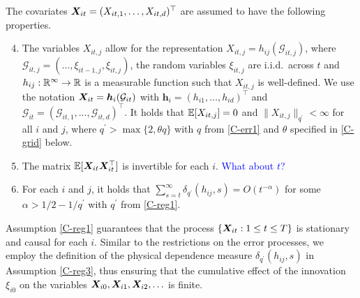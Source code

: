 \documentclass[a4paper,12pt]{article}
\begin{document}
The covariates $\boldsymbol{X}_{it} = (X_{it,1},\ldots,X_{it,d})^\top$ are assumed to have the following properties. 
\begin{enumerate}[label=(C\arabic*),leftmargin=1.05cm]
\setcounter{enumi}{3}
\item \label{C-reg1} The variables $X_{it,j}$ allow for the representation $X_{it,j} = h_{ij}(\mathcal{G}_{it,j})$, where $\mathcal{G}_{it,j} = (\ldots, \xi_{it-1,j}, \xi_{it,j})$, the random variables $\xi_{it,j}$ are i.i.d.\ across $t$ and $h_{ij}: \mathbb{R}^\infty \rightarrow \mathbb{R}$ is a measurable function such that $X_{it,j}$ is well-defined. We use the notation $\boldsymbol{X}_{it} = \boldsymbol{h}_{i}(\mathcal{G}_{it})$ with $\boldsymbol{h}_i = (h_{i1}, \ldots, h_{id})^\top$ and $\mathcal{G}_{it} = (\mathcal{G}_{it,1}, \ldots, \mathcal{G}_{it,d})^\top$. It holds that $\mathbb{E} [X_{it,j}]=0$ and $\| X_{it,j} \|_{q^\prime} <\infty$ for all $i$ and $j$, where $q^\prime > \max \{ 2, \theta q \}$ with $q$ from \ref{C-err1} and $\theta$ specified in \ref{C-grid} below.
\item \label{C-reg2} The matrix $\mathbb{E}[\boldsymbol{X}_{it} \boldsymbol{X}_{it}^\top]$ is invertible for each $i$. \textcolor{blue}{What about $t$?}
\item \label{C-reg3} For each $i$ and $j$, it holds that $\sum_{s=t}^{\infty} \delta_{q^\prime}(h_{ij}, s)= O(t^{-\alpha})$ for some $\alpha > 1/2 - 1/{q^\prime}$ with $q^\prime$ from \ref{C-reg1}.
\end{enumerate}
Assumption \ref{C-reg1} guarantees that the process $\{ \boldsymbol{X}_{it}: 1 \le t \le T \}$ is stationary and causal for each $i$. Similar to the restrictions on the error processes, we employ the definition of the physical dependence measure $\delta_{q^\prime}(h_{ij}, s)$ in Assumption \ref{C-reg3}, thus ensuring that the cumulative effect of the innovation $\xi_{i0}$ on the variables $\boldsymbol{X}_{i0}, \boldsymbol{X}_{i1}, \boldsymbol{X}_{i2},\ldots$ is finite. 
\end{document}
